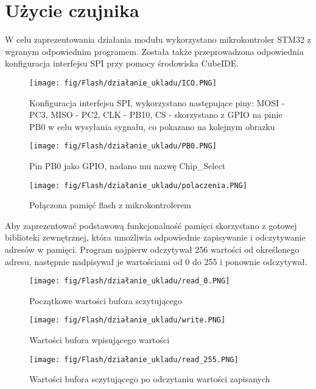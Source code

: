 \documentclass[11pt, a4paper]{article}
\begin{document}
\newpage
{}
\section{Użycie czujnika}
W celu zaprezentowania działania modułu wykorzystano mikrokontroler STM32 z wgranym odpowiednim programem. Została także przeprowadzona odpowiednia konfiguracja interfejsu SPI przy pomocy środowiska CubeIDE.
\vspace{0.3cm}
\begin{figure}[H]
\centering
\texttt{[image: fig/Flash/działanie\_ukladu/ICO.PNG]}
\caption{Konfiguracja interfejsu SPI, wykorzystano następujące piny: MOSI - PC3, MISO - PC2, CLK - PB10, CS - skorzystano z GPIO na pinie PB0 w celu wysyłania sygnału, co pokazano na kolejnym obrazku}
\label{fig:sub3}
\end{figure}
\vspace{0.3cm}
\vspace{0.3cm}
\begin{figure}[H]
\centering
\texttt{[image: fig/Flash/działanie\_ukladu/PB0.PNG]}
\caption{Pin PB0 jako GPIO, nadano mu nazwę Chip\_Select}
\label{fig:sub3}
\end{figure}
\vspace{0.3cm}
\vspace{0.3cm}
\begin{figure}[H]
\centering
\texttt{[image: fig/Flash/działanie\_ukladu/polaczenia.PNG]}
\caption{Połączona pamięć flash z mikrokontrolerem}
\label{fig:sub3}
\end{figure}
\vspace{0.3cm}
Aby zaprezentować podstawową funkcjonalność pamięci skorzystano z gotowej biblioteki zewnętrznej, która umożliwia odpowiednie zapisywanie i odczytywanie adresów w pamięci. Program najpierw odczytywał 256 wartości od określonego adresu, następnie nadpisywał je wartościami od 0 do 255 i ponownie odczytywał. 
\vspace{0.3cm}
\begin{figure}[H]
\centering
\texttt{[image: fig/Flash/działanie\_ukladu/read\_0.PNG]}
\caption{Początkowe wartości bufora sczytującego}
\label{fig:sub3}
\end{figure}
\vspace{0.3cm}
\vspace{0.3cm}
\begin{figure}[H]
\centering
\texttt{[image: fig/Flash/działanie\_ukladu/write.PNG]}
\caption{Wartości bufora wpisującego wartości}
\label{fig:sub3}
\end{figure}
\vspace{0.3cm}
\vspace{0.3cm}
\begin{figure}[H]
\centering
\texttt{[image: fig/Flash/działanie\_ukladu/read\_255.PNG]}
\caption{Wartości bufora sczytującego po odczytaniu wartości zapisanych}
\label{fig:sub3}
\end{figure}
\vspace{0.3cm}



\end{document}
